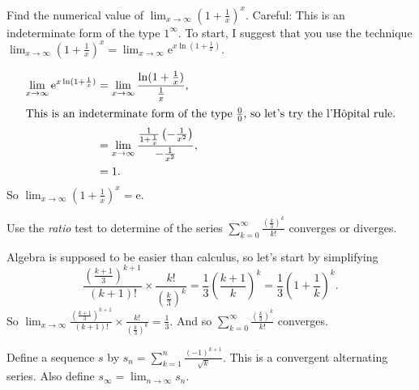 \documentclass[12pt,fleqn,answers]{exam}
\begin{document}
\begin{questions} 

\question [1] Find the numerical value of $\displaystyle \lim_{x \to \infty}   \left(1 + \frac{1}{x}\right)^x$.  Careful: This is 
an indeterminate form of the type $1^\infty$.  To start, I suggest that you use the technique
$
  \displaystyle  \lim_{x \to \infty}   \left(1 + \frac{1}{x}\right)^x = \lim_{x \to \infty}  \mathrm{e}^{x   \ln (1 + \frac{1}{x})}.
$

\begin{solution}[2.6in]
\begin{align*}
  \lim_{x \to \infty}  \mathrm{e}^{x   \ln (1 + \frac{1}{x})} &=  \lim_{x \to \infty} 
                      \frac{\ln(1+\frac{1}{x})} {\frac{1}{x}}, \\
\intertext{This is an indeterminate form of the type $\frac{0}{0}$, so let's try the l'H\^opital rule.}
                                      &=  \lim_{x \to \infty}  \frac{\frac{1}{1 + \frac{1}{x}} \left(- \frac{1}{x^2} \right)} {-\frac{1}{x^2}}, \\
                                      &= 1.
\end{align*}
So $\displaystyle  \lim_{x \to \infty}   \left(1 + \frac{1}{x}\right)^x = \mathrm{e}$.
\end{solution}

\question [1] Use the \emph{ratio} test to determine of the series $\sum_{k=0}^\infty \frac{  \left(\frac{k}{3} \right)^k }{ k!}$ converges or diverges.
\begin{solution}%
Algebra is supposed to be easier than calculus, so let's start by simplifying
\begin{equation*}
\frac{ (\frac{k+1}{3})^{k+1}}{(k+1)!} \times \frac{k!}{ (\frac{k}{3})^k} = 
\frac{1}{3} (\frac{k+1}{k})^k = \frac{1}{3}  (1 + \frac{1}{k})^k.
\end{equation*}
So $\displaystyle  \lim_{x \to \infty} \frac{ (\frac{k+1}{3})^{k+1}}{(k+1)!} \times \frac{k!}{ (\frac{k}{3})^k} = \frac{1}{3}$.
And so $\displaystyle \sum_{k=0}^\infty \frac{  \left(\frac{k}{3} \right)^k }{ k!}$ converges. 
\end{solution}

\newpage

\question [1] Define a sequence $s$ by $\displaystyle s_n = \sum_{k=1}^n \frac{(-1)^{k+1}}{\sqrt{k}}$.  This is a convergent alternating series.
Also define \mbox{$\displaystyle s_\infty = \lim_{n \to \infty}  s_n$.}

\begin{parts}


\end{parts}
\end{questions}
\end{document}
